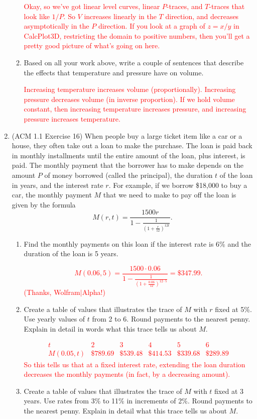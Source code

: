 \documentclass[10pt]{article}
\newcommand{\red}[1]{ %
\textcolor{red}{#1} }%
\begin{document}
\begin{enumerate}[leftmargin=0pt]
\begin{enumerate}
        \red{Okay, so we've got linear level curves, linear $P$-traces, and $T$-traces that look like $1/P$. So $V$ increases linearly in the $T$ direction, and decreases asymptotically in the $P$ direction. If you look at a graph of $z = x/y$ in CalcPlot3D, restricting the domain to positive numbers, then you'll get a pretty good picture of what's going on here.
        }
        \item Based on all your work above, write a couple of sentences that describe the effects that temperature and pressure have on volume.
        
        \red{Increasing temperature increases volume (proportionally). Increasing pressure decreases volume (in inverse proportion). If we hold volume constant, then increasing temperature increases pressure, and increasing pressure increases temperature.}
    \end{enumerate}
    \item (ACM 1.1 Exercise 16) When people buy a large ticket item like a car or a house, they often take out a loan to make the purchase. The loan is paid back in monthly installments until the entire amount of the loan, plus interest, is paid. The monthly payment that the borrower has to make depends on the amount $P$ of money borrowed (called the principal), the duration $t$ of the loan in years, and the interest rate $r$. For example, if we borrow \$18,000 to buy a car, the monthly payment $M$ that we need to make to pay off the loan is given by the formula \[M(r,t) = \frac{1500r}{1-\frac{1}{\left(1+\frac{r}{12}\right)^{12t}}}.\]
    \begin{enumerate}
        \item Find the monthly payments on this loan if the interest rate is 6\% and the duration of the loan is 5 years.
        
        \red{\[M(0.06, 5) = \frac{1500\cdot 0.06}
        {1-\frac{1}{\left(1+\frac{0.06}{12}\right)^{12\cdot 5}}} = \$347.99.\]
        (Thanks, Wolfram$|$Alpha!)}
        \newpage
        \item Create a table of values that illustrates the trace of $M$ with $r$ fixed at 5\%. Use yearly values of $t$ from 2 to 6. Round payments to the nearest penny. Explain in detail in words what this trace tells us about $M$.
        
        \red{
        \[
        \begin{array}{c|c|c|c|c|c}
            t          & 2        & 3        & 4        & 5        & 6        \\
            \hline
            M(0.05, t) & \$789.69 & \$539.48 & \$414.53 & \$339.68 & \$289.89
        \end{array}
        \]
        So this tells us that at a fixed interest rate, extending the loan duration decreases the monthly payments (in fact, by a decreasing amount).
        }
        \item Create a table of values that illustrates the trace of $M$ with $t$ fixed at 3 years. Use rates from 3\% to 11\% in increments of 2\%. Round payments to the nearest penny. Explain in detail what this trace tells us about $M$.
        

\end{enumerate}
\end{enumerate}
\end{document}
